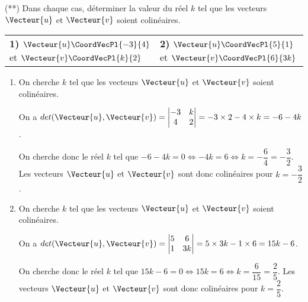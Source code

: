 \documentclass[a4paper]{article}
\begin{document}
\begin{exercice}{(**)}{}
  Dans chaque cas, déterminer la valeur du réel $k$ tel que les vecteurs $\Vecteur{u}$ et $\Vecteur{v}$ soient colinéaires.
   \begin{center}
    \begin{tabularx}{.95\linewidth}{X X}
    \textbf{1)} $\Vecteur{u}\CoordVecPl{-3}{4}$ et $\Vecteur{v}\CoordVecPl{k}{2}$ & \textbf{2)} $\Vecteur{u}\CoordVecPl{5}{1}$ et $\Vecteur{v}\CoordVecPl{6}{3k}$\\
    \end{tabularx}
  \end{center}

  \begin{enumerate}
    \item On cherche $k$ tel que les vecteurs $\Vecteur{u}$ et $\Vecteur{v}$ soient colinéaires.
    
    On a $det(\Vecteur{u}, \Vecteur{v})=\begin{vmatrix}
      -3 & k\\
      4 & 2 
    \end{vmatrix}=-3\times 2-4\times k=-6-4k$.

    On cherche donc le réel $k$ tel que $-6-4k=0 \iff -4k=6 \iff k=-\dfrac{6}{4}=-\dfrac{3}{2}$. Les vecteurs $\Vecteur{u}$ et $\Vecteur{v}$ sont donc colinéaires pour $k=-\dfrac{3}{2}$.

    \item On cherche $k$ tel que les vecteurs $\Vecteur{u}$ et $\Vecteur{v}$ soient colinéaires.

    On a $det(\Vecteur{u}, \Vecteur{v})=\begin{vmatrix}
      5 & 6\\
      1 & 3k
    \end{vmatrix}=5\times 3k-1\times 6=15k-6$.

    On cherche donc le réel $k$ tel que $15k-6=0 \iff 15k=6 \iff k=\dfrac{6}{15}=\dfrac{2}{5}$. Les vecteurs $\Vecteur{u}$ et $\Vecteur{v}$ sont donc colinéaires pour $k=\dfrac{2}{5}$.
  \end{enumerate}
  \end{exercice}
\end{document}
